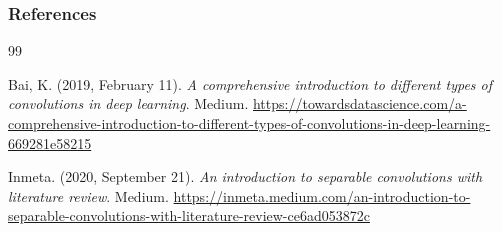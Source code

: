 \documentclass[11pt,compress,t,notes=noshow, xcolor=table]{beamer}
\begin{document}
\begin{vbframe}
\frametitle{References}
\footnotesize{
\begin{thebibliography}{99}

Bai, K. (2019, February 11). \textit{A comprehensive introduction to different types of convolutions in deep learning}. Medium. \url{https://towardsdatascience.com/a-comprehensive-introduction-to-different-types-of-convolutions-in-deep-learning-669281e58215}

Inmeta. (2020, September 21). \textit{An introduction to separable convolutions with literature review}. Medium. \url{https://inmeta.medium.com/an-introduction-to-separable-convolutions-with-literature-review-ce6ad053872c}



\end{thebibliography}}
\end{vbframe}
\end{document}
